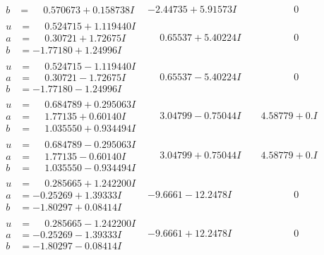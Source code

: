 \documentclass[1p]{elsarticle_modified}
\theoremstyle{definition}
\begin{document}
$$\begin{array}{c|c|c}
\begin{aligned}
b &= \phantom{-}0.570673 + 0.158738 I\end{aligned}
 & -2.44735 + 5.91573 I & \phantom{-0.000000 } 0 \\ \hline\begin{aligned}
u &= \phantom{-}0.524715 + 1.119440 I \\
a &= \phantom{-}0.30721 + 1.72675 I \\
b &= -1.77180 + 1.24996 I\end{aligned}
 & \phantom{-}0.65537 + 5.40224 I & \phantom{-0.000000 } 0 \\ \hline\begin{aligned}
u &= \phantom{-}0.524715 - 1.119440 I \\
a &= \phantom{-}0.30721 - 1.72675 I \\
b &= -1.77180 - 1.24996 I\end{aligned}
 & \phantom{-}0.65537 - 5.40224 I & \phantom{-0.000000 } 0 \\ \hline\begin{aligned}
u &= \phantom{-}0.684789 + 0.295063 I \\
a &= \phantom{-}1.77135 + 0.60140 I \\
b &= \phantom{-}1.035550 + 0.934494 I\end{aligned}
 & \phantom{-}3.04799 - 0.75044 I & \phantom{-}4.58779 + 0. I\phantom{ +0.000000I} \\ \hline\begin{aligned}
u &= \phantom{-}0.684789 - 0.295063 I \\
a &= \phantom{-}1.77135 - 0.60140 I \\
b &= \phantom{-}1.035550 - 0.934494 I\end{aligned}
 & \phantom{-}3.04799 + 0.75044 I & \phantom{-}4.58779 + 0. I\phantom{ +0.000000I} \\ \hline\begin{aligned}
u &= \phantom{-}0.285665 + 1.242200 I \\
a &= -0.25269 + 1.39333 I \\
b &= -1.80297 + 0.08414 I\end{aligned}
 & -9.6661 - 12.2478 I & \phantom{-0.000000 } 0 \\ \hline\begin{aligned}
u &= \phantom{-}0.285665 - 1.242200 I \\
a &= -0.25269 - 1.39333 I \\
b &= -1.80297 - 0.08414 I\end{aligned}
 & -9.6661 + 12.2478 I & \phantom{-0.000000 } 0 \\ \hline\begin{aligned}

\end{aligned}
\end{array}$$
\end{document}
